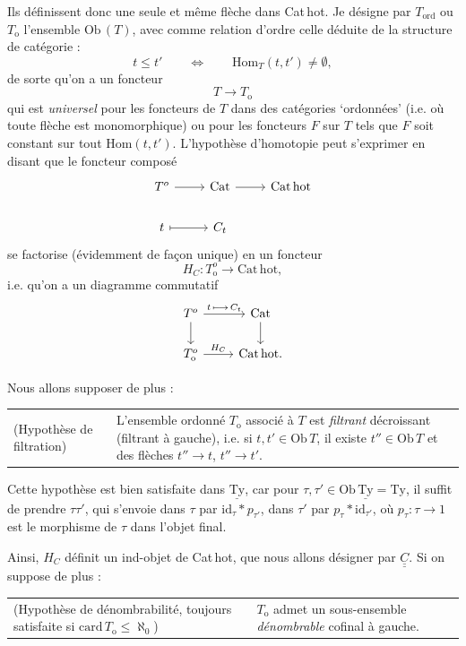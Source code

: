 \documentclass[11pt]{article}
\newcommand{\printedpage}[1]{\marginpar{\footnotesize p.~#1}}
\newcommand{\msp}[1]{\marginpar{\footnotesize [#1]}}
\newcommand{\uTy}{\underline{\mathrm{Ty}}}
\newcommand{\Hom}{\mathrm{Hom}}
\newcommand{\Cat}{\mathrm{Cat}}
\newcommand{\Cathot}{\mathrm{Cat\,hot}}
\newcommand{\Ob}{\mathrm{Ob}\,}
\newcommand{\To}{T_{\mathrm{o}}}
\begin{document}
Ils définissent donc une seule et même flèche dans Cat\,hot. Je désigne par $T_{\mathrm{ord}}$ ou $\To$ l'ensemble $\Ob(T)$, avec comme relation d'ordre celle déduite de la structure de catégorie :
\[
t \leq t' \qquad\Longleftrightarrow\qquad \Hom_{T}(t,t') \neq \emptyset,
\]
de sorte qu'on a un foncteur
\[
T \longrightarrow \To
\]
qui est \textit{universel} pour les foncteurs de $T$ dans des catégories ‘ordonnées' (i.e. où toute flèche est monomorphique) ou pour les foncteurs $F$ sur $T$ tels que $F$ soit constant sur tout $\Hom(t,t')$. L'hypothèse d'homotopie peut s'exprimer en disant que le foncteur composé
\[
\begin{tikzcd}
T^{o} \arrow[r] & \Cat \arrow[r] & \Cathot \\
t \arrow[r, mapsto] & C_{t} &
\end{tikzcd}
\]
\msp{page 100}
se factorise (évidemment de façon unique) en un foncteur
\[
H_{C} : \To^{o} \longrightarrow \Cathot,
\]
i.e. qu'on a un diagramme commutatif
\printedpage{65}
\[
\begin{tikzcd}
T^{o} \arrow[r, "t\,\longmapsto\, C_{t}"] \arrow[d] & \Cat \arrow[d] \\
\To^{o} \arrow[r, "H_{C}"] & \Cathot.
\end{tikzcd}
\]

Nous allons supposer de plus :

\noindent\begin{tabular}{@{}p{}p{}@{}}
(Hypothèse de filtration) & L'ensemble ordonné $\To$ associé à $T$ est \textit{filtrant} décroissant (filtrant à gauche), i.e. si $t,t' \in \Ob T$, il existe $t'' \in \Ob T$ et des flèches $t'' \longrightarrow t$, $t'' \longrightarrow t'$.
\end{tabular}

Cette hypothèse est bien satisfaite dans $\uTy$, car pour $\tau,\tau' \in \Ob \uTy = \mathrm{Ty}$, il suffit de prendre $\tau\tau'$, qui s'envoie dans $\tau$ par $\mathrm{id}_{\tau} * p_{\tau'}$, dans $\tau'$ par $p_{\tau} * \mathrm{id}_{\tau'}$, où $p_{\tau} : \tau \longrightarrow 1$ est le morphisme de $\tau$ dans l'objet final.

Ainsi, $H_{C}$ définit un ind-objet de Cat\,hot, que nous allons désigner par $\underline{\underline{C}}$. Si on suppose de plus :

\noindent\begin{tabular}{@{}p{}p{}@{}}
(Hypothèse de dénombrabilité, toujours satisfaite si $\mathrm{card}\,\To \leq \aleph_{0}$) & $\To$ admet un sous-ensemble \textit{dénombrable} cofinal à gauche.
\end{tabular}
\end{document}
